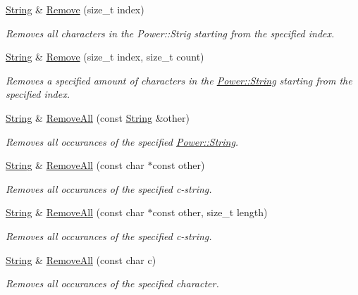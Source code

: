 \begin{DoxyCompactItemize}
\hyperlink{class_power_1_1_string}{String} \& \hyperlink{class_power_1_1_string_a02dcfcbe27a01bf938d9ce038a0487ef}{Remove} (size\+\_\+t index)
\begin{DoxyCompactList}\small\item\em Removes all characters in the Power\+::\+Strig starting from the specified index. \end{DoxyCompactList}\item 
\hyperlink{class_power_1_1_string}{String} \& \hyperlink{class_power_1_1_string_a43f1d459afdc0a80c72be214f54f7187}{Remove} (size\+\_\+t index, size\+\_\+t count)
\begin{DoxyCompactList}\small\item\em Removes a specified amount of characters in the \hyperlink{class_power_1_1_string}{Power\+::\+String} starting from the specified index. \end{DoxyCompactList}\item 
\hyperlink{class_power_1_1_string}{String} \& \hyperlink{class_power_1_1_string_a43b649fe2658dc5d81e3c5e245dedc6e}{Remove\+All} (const \hyperlink{class_power_1_1_string}{String} \&other)
\begin{DoxyCompactList}\small\item\em Removes all occurances of the specified \hyperlink{class_power_1_1_string}{Power\+::\+String}. \end{DoxyCompactList}\item 
\hyperlink{class_power_1_1_string}{String} \& \hyperlink{class_power_1_1_string_add8a90782cd07cc66c639c364d828f1b}{Remove\+All} (const char $\ast$const other)
\begin{DoxyCompactList}\small\item\em Removes all occurances of the specified c-\/string. \end{DoxyCompactList}\item 
\hyperlink{class_power_1_1_string}{String} \& \hyperlink{class_power_1_1_string_a749b4acfb84cb4865994d5094271ae86}{Remove\+All} (const char $\ast$const other, size\+\_\+t length)
\begin{DoxyCompactList}\small\item\em Removes all occurances of the specified c-\/string. \end{DoxyCompactList}\item 
\hyperlink{class_power_1_1_string}{String} \& \hyperlink{class_power_1_1_string_a64645e19944f9cee21097d33dc704211}{Remove\+All} (const char c)
\begin{DoxyCompactList}\small\item\em Removes all occurances of the specified character. \end{DoxyCompactList}\item 

\end{DoxyCompactItemize}

